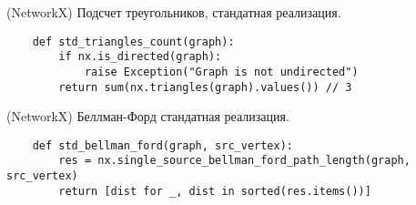 \begin{minipage}{0.96\textwidth}
\begin{algorithm}[H]
    \centering
    \caption{(NetworkX) Подсчет треугольников, стандатная реализация.}\label{tri_std}
    \begin{verbatim}
    def std_triangles_count(graph):
        if nx.is_directed(graph):
            raise Exception("Graph is not undirected")
        return sum(nx.triangles(graph).values()) // 3
    \end{verbatim}
\end{algorithm}
\end{minipage}\hfill

\begin{minipage}{0.96\textwidth}
\begin{algorithm}[H]
    \centering
    \caption{(NetworkX) Беллман-Форд стандатная реализация.}\label{bford_std}
    \begin{verbatim}
    def std_bellman_ford(graph, src_vertex):
        res = nx.single_source_bellman_ford_path_length(graph, src_vertex)
        return [dist for _, dist in sorted(res.items())]
    \end{verbatim}
\end{algorithm}
\end{minipage}\hfill